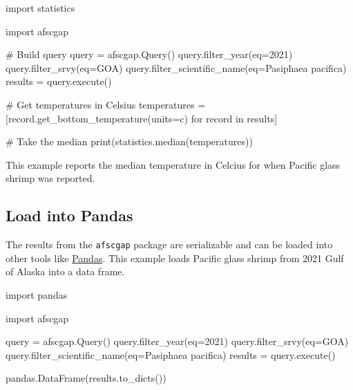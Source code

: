 \documentclass[
  letterpaper,
  oneside,
  open=any]{scrbook}
\newenvironment{Shaded}{\begin{snugshade}}{\end{snugshade}}
\newcommand{\AttributeTok}[1]{\textcolor[rgb]{0.40,0.45,0.13}{#1}}
\newcommand{\CommentTok}[1]{\textcolor[rgb]{0.37,0.37,0.37}{#1}}
\newcommand{\ControlFlowTok}[1]{\textcolor[rgb]{0.00,0.23,0.31}{#1}}
\newcommand{\DecValTok}[1]{\textcolor[rgb]{0.68,0.00,0.00}{#1}}
\newcommand{\FunctionTok}[1]{\textcolor[rgb]{0.28,0.35,0.67}{#1}}
\newcommand{\NormalTok}[1]{\textcolor[rgb]{0.00,0.23,0.31}{#1}}
\newcommand{\OtherTok}[1]{\textcolor[rgb]{0.00,0.23,0.31}{#1}}
\newcommand{\StringTok}[1]{\textcolor[rgb]{0.13,0.47,0.30}{#1}}
\begin{document}
\begin{Shaded}
\begin{Highlighting}[]
\NormalTok{import statistics}

\NormalTok{import afscgap}

\CommentTok{\# Build query}
\NormalTok{query }\OtherTok{=} \FunctionTok{afscgap.Query}\NormalTok{()}
\FunctionTok{query.filter\_year}\NormalTok{(}\AttributeTok{eq=}\DecValTok{2021}\NormalTok{)}
\FunctionTok{query.filter\_srvy}\NormalTok{(}\AttributeTok{eq=}\StringTok{\textquotesingle{}GOA\textquotesingle{}}\NormalTok{)}
\FunctionTok{query.filter\_scientific\_name}\NormalTok{(}\AttributeTok{eq=}\StringTok{\textquotesingle{}Pasiphaea pacifica\textquotesingle{}}\NormalTok{)}
\NormalTok{results }\OtherTok{=} \FunctionTok{query.execute}\NormalTok{()}

\CommentTok{\# Get temperatures in Celsius}
\NormalTok{temperatures }\OtherTok{=}\NormalTok{ [}\FunctionTok{record.get\_bottom\_temperature}\NormalTok{(}\AttributeTok{units=}\StringTok{\textquotesingle{}c\textquotesingle{}}\NormalTok{) }\ControlFlowTok{for}\NormalTok{ record }\ControlFlowTok{in}\NormalTok{ results]}

\CommentTok{\# Take the median}
\FunctionTok{print}\NormalTok{(}\FunctionTok{statistics.median}\NormalTok{(temperatures))}
\end{Highlighting}
\end{Shaded}

This example reports the median temperature in Celcius for when Pacific
glass shrimp was reported.

\subsection{Load into Pandas}\label{load-into-pandas}

The results from the \texttt{afscgap} package are serializable and can
be loaded into other tools like
\href{https://pandas.pydata.org/}{Pandas}. This example loads Pacific
glass shrimp from 2021 Gulf of Alaska into a data frame.

\begin{Shaded}
\begin{Highlighting}[]
\NormalTok{import pandas}

\NormalTok{import afscgap}

\NormalTok{query }\OtherTok{=} \FunctionTok{afscgap.Query}\NormalTok{()}
\FunctionTok{query.filter\_year}\NormalTok{(}\AttributeTok{eq=}\DecValTok{2021}\NormalTok{)}
\FunctionTok{query.filter\_srvy}\NormalTok{(}\AttributeTok{eq=}\StringTok{\textquotesingle{}GOA\textquotesingle{}}\NormalTok{)}
\FunctionTok{query.filter\_scientific\_name}\NormalTok{(}\AttributeTok{eq=}\StringTok{\textquotesingle{}Pasiphaea pacifica\textquotesingle{}}\NormalTok{)}
\NormalTok{results }\OtherTok{=} \FunctionTok{query.execute}\NormalTok{()}

\FunctionTok{pandas.DataFrame}\NormalTok{(}\FunctionTok{results.to\_dicts}\NormalTok{())}
\end{Highlighting}
\end{Shaded}
\end{document}
